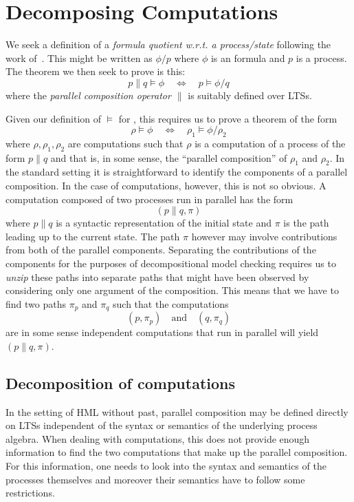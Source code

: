 \section{Decomposing Computations} %
\label{sec:decomp_comp}

We seek a definition of a \emph{formula quotient w.r.t. a process/state}
following the work of~\cite{Larsen91}.
This might be written as $\phi / p$ where $\phi$ is an \HMLpast{} formula
and $p$ is a process. The theorem we then seek to prove is this:
\[
    p \parallel q \vDash \phi  \quad\Leftrightarrow\quad p \vDash \phi / q
\]
where the \emph{parallel composition operator $\parallel$} is suitably defined
over LTSs.

Given our definition of $\vDash$ for \HMLpast, this requires us to prove
a theorem of the form
\[
    \rho \vDash \phi  \quad\Leftrightarrow\quad \rho_1 \vDash \phi / \rho_2
\]
where $\rho,\rho_1,\rho_2$ are computations such that $\rho$ is 
a computation of a process of the form $p \parallel q$ and that is,
in some sense,
the ``parallel composition'' of $\rho_1$ and $\rho_2$. In the 
standard setting it is straightforward to identify the components of a
parallel composition. In the case of computations, however, this is not so
obvious. A computation composed of two processes run in parallel has the form
\[
    (p\parallel q, \pi)
\]
where $p\parallel q$ is a syntactic representation of the initial state and
$\pi$ is the path leading up to the current state. The path $\pi$ however
may involve contributions from both of the parallel components.
Separating the contributions of the components
for the purposes of decompositional model checking requires us to \emph{unzip}
these paths into separate paths that might have been observed by considering
only one argument of the composition. This means that we have to find two paths $\pi_p$
and $\pi_q$ such that the computations
\[
    (p, \pi_p) \quad\textrm{and}\quad (q, \pi_q)
\]
are in some sense independent computations that run in parallel will
yield \mbox{$(p\parallel q, \pi)$}.


\subsection{Decomposition of computations} %
\label{sub:decomposition_of_computations}

In the setting of HML without past, parallel composition may be defined 
directly on LTSs independent
of the syntax or semantics of the underlying process algebra. When dealing
with computations, this does not provide enough information to find the two
computations that make up the parallel composition. For this information, one
needs to look into the syntax and semantics of the processes themselves and
moreover their semantics have to follow some restrictions.

